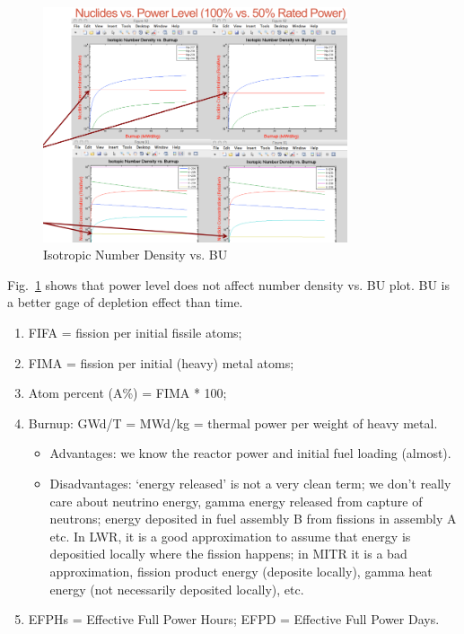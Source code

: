 \documentclass{school-22.211-notes}
\begin{document}
\clearpage
{}
\begin{figure}[h]
  \centering
  \includegraphics[width=0.8\textwidth]{images/dfs/nuclide-vs-power.png}  
  \caption{Isotropic Number Density vs. BU} \label{n-vs-BU} 
\end{figure}
Fig.~\ref{n-vs-BU} shows that power level does not affect number
density vs. BU plot. BU is a better gage of depletion effect than
time.

\begin{enumerate}
\item FIFA = fission per initial fissile atoms;
\item FIMA = fission per initial (heavy) metal atoms;
\item Atom percent (A\%) = FIMA * 100;
\item Burnup: GWd/T = MWd/kg = thermal power per weight of heavy metal. 
  \begin{itemize}
    \item Advantages: we know the reactor power and initial fuel
      loading (almost).
    \item Disadvantages: `energy released' is not a very clean term;
      we don't really care about neutrino energy, gamma energy
      released from capture of neutrons; energy deposited in fuel
      assembly B from fissions in assembly A etc. In LWR, it is a good
      approximation to assume that energy is depositied locally where
      the fission happens; in MITR it is a bad approximation, fission
      product energy (deposite locally), gamma heat energy (not
      necessarily deposited locally), etc.
  \end{itemize}
\item EFPHs = Effective Full Power Hours; EFPD = Effective Full Power Days. 
\end{enumerate}
\end{document}
